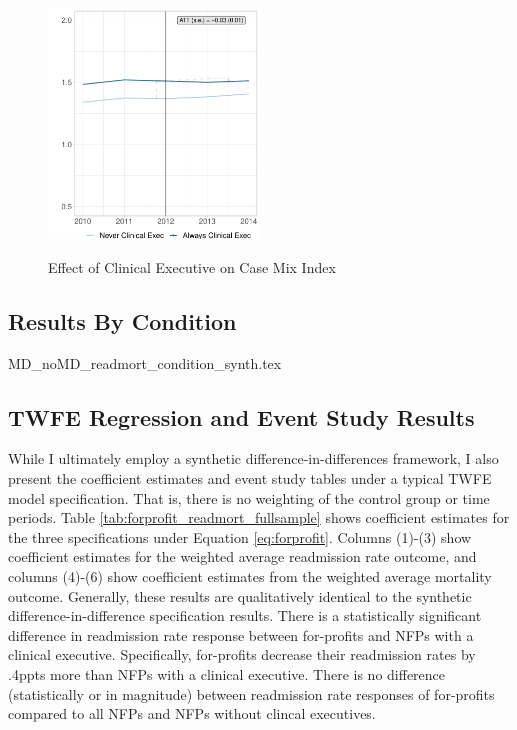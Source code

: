 \documentclass[12pt]{article}
\begin{document}
    \begin{figure}[ht!]
        \centering
        \caption{Effect of Clinical Executive on Case Mix Index}
        \includegraphics[width=0.5\textwidth]{Objects/cmi_md_nomd_synth_graph.pdf}
        \label{fig:main_cmi_clinical}
    \end{figure}


\subsection{Results By Condition}\label{app:condition}


{MD_noMD_readmort_condition_synth.tex}

\subsection{TWFE Regression and Event Study Results}\label{app:fullsample}

While I ultimately employ a synthetic difference-in-differences framework, I also present the coefficient estimates and event study tables under a typical TWFE model specification. That is, there is no weighting of the control group or time periods. Table \ref{tab:forprofit_readmort_fullsample} shows coefficient estimates for the three specifications under Equation \ref{eq:forprofit}. Columns (1)-(3) show coefficient estimates for the weighted average readmission rate outcome, and columns (4)-(6) show coefficient estimates from the weighted average mortality outcome. Generally, these results are qualitatively identical to the synthetic difference-in-difference specification results. There is a statistically significant difference in readmission rate response between for-profits and NFPs with a clinical executive. Specifically, for-profits decrease their readmission rates by .4ppts more than NFPs with a clinical executive. There is no difference (statistically or in magnitude) between readmission rate responses of for-profits compared to all NFPs and NFPs without clincal executives. 
\end{document}
